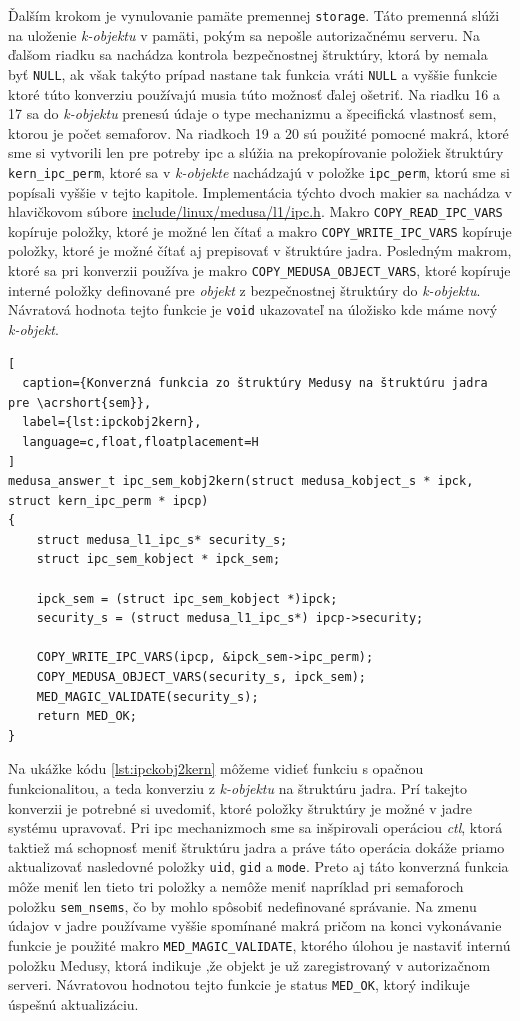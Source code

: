 Ďalším krokom je vynulovanie pamäte premennej \texttt{storage}. Táto premenná slúži na uloženie \textit{k-objektu} v pamäti, pokým sa nepošle autorizačnému serveru. Na ďalšom riadku sa nachádza kontrola bezpečnostnej štruktúry, ktorá by nemala byť \texttt{NULL}, ak však takýto prípad nastane tak funkcia vráti \texttt{NULL} a vyššie funkcie ktoré túto konverziu používajú musia túto možnosť ďalej ošetriť. Na riadku 16 a 17 sa do \textit{k-objektu} prenesú údaje o type mechanizmu a špecifická vlastnosť \acrshort{sem}, ktorou je počet semaforov. Na riadkoch 19 a 20 sú použité pomocné makrá, ktoré sme si vytvorili len pre potreby \acrshort{ipc} a slúžia na prekopírovanie položiek štruktúry \texttt{kern\_ipc\_perm}, ktoré sa v \textit{k-objekte} nachádzajú v položke \texttt{ipc\_perm}, ktorú sme si popísali vyššie v tejto kapitole. Implementácia týchto dvoch makier sa nachádza v hlavičkovom súbore \url{include/linux/medusa/l1/ipc.h}. Makro \texttt{COPY\_READ\_IPC\_VARS} kopíruje položky, ktoré je možné len čítať a makro \texttt{COPY\_WRITE\_IPC\_VARS} kopíruje položky, ktoré je možné čítať aj prepisovať v štruktúre jadra. Posledným makrom, ktoré sa pri konverzii používa je makro \texttt{COPY\_MEDUSA\_OBJECT\_VARS}, ktoré kopíruje interné položky definované pre \textit{objekt} z bezpečnostnej štruktúry do \textit{k-objektu}. Návratová hodnota tejto funkcie je \texttt{void} ukazovateľ na úložisko kde máme nový \textit{k-objekt}.

\begin{lstlisting}[
  caption={Konverzná funkcia zo štruktúry Medusy na štruktúru jadra pre \acrshort{sem}},
  label={lst:ipckobj2kern},
  language=c,float,floatplacement=H
]
medusa_answer_t ipc_sem_kobj2kern(struct medusa_kobject_s * ipck, struct kern_ipc_perm * ipcp)
{
	struct medusa_l1_ipc_s* security_s;
	struct ipc_sem_kobject * ipck_sem;

	ipck_sem = (struct ipc_sem_kobject *)ipck;
	security_s = (struct medusa_l1_ipc_s*) ipcp->security;

	COPY_WRITE_IPC_VARS(ipcp, &ipck_sem->ipc_perm);
	COPY_MEDUSA_OBJECT_VARS(security_s, ipck_sem);
	MED_MAGIC_VALIDATE(security_s);
	return MED_OK;
}
\end{lstlisting}

Na ukážke kódu \ref{lst:ipckobj2kern} môžeme vidieť funkciu s opačnou funkcionalitou, a teda konverziu z \textit{k-objektu} na štruktúru jadra. Prí takejto konverzii je potrebné si uvedomiť, ktoré položky štruktúry je možné v jadre systému upravovať. Pri \acrshort{ipc} mechanizmoch sme sa inšpirovali operáciou \textit{ctl}, ktorá taktiež má schopnosť meniť štruktúru jadra a práve táto operácia dokáže priamo aktualizovať nasledovné položky \texttt{uid}, \texttt{gid} a \texttt{mode}. Preto aj táto konverzná funkcia môže meniť len tieto tri položky a nemôže meniť napríklad pri semaforoch položku \texttt{sem\_nsems}, čo by mohlo spôsobiť nedefinované správanie. Na zmenu údajov v jadre používame vyššie spomínané makrá pričom na konci vykonávanie funkcie je použité makro \texttt{MED\_MAGIC\_VALIDATE}, ktorého úlohou je nastaviť internú položku Medusy, ktorá indikuje ,že objekt je už zaregistrovaný v autorizačnom serveri. Návratovou hodnotou tejto funkcie je status \texttt{MED\_OK}, ktorý indikuje úspešnú aktualizáciu.

